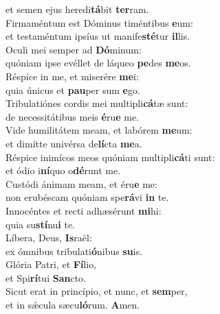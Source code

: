 \evenverse et semen ejus heredi\textbf{tá}bit \textbf{ter}ram.\\
\oddverse Firmaméntum est Dóminus timéntibus \textbf{e}um:~\*\\
\oddverse et testaméntum ipsíus ut manife\textbf{sté}tur \textbf{il}lis.\\
\evenverse Oculi mei semper ad \textbf{Dó}minum:~\*\\
\evenverse quóniam ipse evéllet de láqueo \textbf{pe}des \textbf{me}os.\\
\oddverse Réspice in me, et miserére \textbf{me}i:~\*\\
\oddverse quia únicus et \textbf{pau}per sum \textbf{e}go.\\
\evenverse Tribulatiónes cordis mei multipli\textbf{cá}tæ sunt:~\*\\
\evenverse de necessitátibus meis \textbf{é}ru\textbf{e} me.\\
\oddverse Vide humilitátem meam, et labórem \textbf{me}um:~\*\\
\oddverse et dimítte univérsa de\textbf{lí}cta \textbf{me}a.\\
\evenverse Réspice inimícos meos quóniam multipli\textbf{cá}ti sunt:~\*\\
\evenverse et ódio i\textbf{ní}quo o\textbf{dé}runt me.\\
\oddverse Custódi ánimam meam, et éru\textbf{e} me:~\*\\
\oddverse non erubéscam quóniam spe\textbf{rá}vi \textbf{in} te.\\
\evenverse Innocéntes et recti adhæsérunt \textbf{mi}hi:~\*\\
\evenverse quia su\textbf{stí}nu\textbf{i} te.\\
\oddverse Líbera, Deus, \textbf{Is}raël:~\*\\
\oddverse ex ómnibus tribulati\textbf{ó}nibus \textbf{su}is.\\
\evenverse Glória Patri, et \textbf{Fí}lio,~\*\\
\evenverse et Spi\textbf{rí}tui \textbf{San}cto.\\
\oddverse Sicut erat in princípio, et nunc, et \textbf{sem}per,~\*\\
\oddverse et in sǽcula sæcu\textbf{ló}rum. \textbf{A}men.\\
